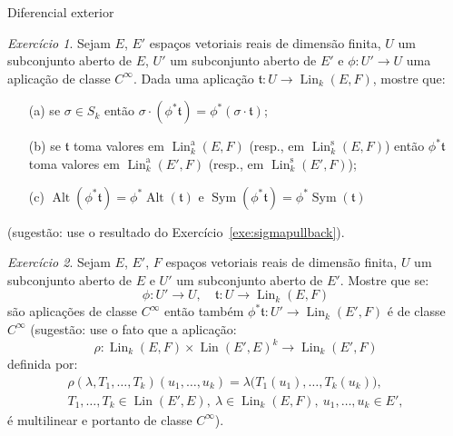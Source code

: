 \documentclass[oneside,11pt]{amsart}
\DeclareMathOperator{\Lin}{Lin}
\DeclareMathOperator{\Sym}{Sym}
\DeclareMathOperator{\Alt}{Alt}
\theoremstyle{remark}\newtheorem{exercise}{Exercício}[section]
\theoremstyle{plain}\newtheorem{teo}{Teorema}[section]
\theoremstyle{plain}\newtheorem{lem}[teo]{Lema}
\theoremstyle{plain}\newtheorem{prop}[teo]{Proposição}
\theoremstyle{definition}\newtheorem{defin}[teo]{Definição}
\theoremstyle{remark}\newtheorem{rem}[teo]{Observação}
\theoremstyle{definition}\newtheorem{example}[teo]{Exemplo}
\numberwithin{equation}{section}
\begin{document}
\begin{section}{Diferencial exterior}
\begin{exercise}\label{exe:sigmapullback2}
Sejam $E$, $E'$ espaços vetoriais reais de dimensão finita, $U$ um subconjunto aberto de $E$, $U'$ um subconjunto aberto de $E'$
e $\phi:U'\to U$ uma aplicação de classe $C^\infty$. Dada uma aplicação $\mathfrak t:U\to\Lin_k(E,F)$, mostre que:
\begin{itemize}
\item[(a)] se $\sigma\in S_k$ então $\sigma\cdot(\phi^*\mathfrak t)=\phi^*(\sigma\cdot\mathfrak t)$;
\item[(b)] se $\mathfrak t$ toma valores em $\Lin_k^{\mathrm a}(E,F)$ (resp., em $\Lin_k^{\mathrm s}(E,F)$) então
$\phi^*\mathfrak t$ toma valores em $\Lin_k^{\mathrm a}(E',F)$ (resp., em $\Lin_k^{\mathrm s}(E',F)$);
\item[(c)] $\Alt(\phi^*\mathfrak t)=\phi^*\Alt(\mathfrak t)$ e $\Sym(\phi^*\mathfrak t)=\phi^*\Sym(\mathfrak t)$
\end{itemize}
(sugestão: use o resultado do Exercício~\ref{exe:sigmapullback}).
\end{exercise}

\begin{exercise}\label{exe:pullbacksmoothvecspa}
Sejam $E$, $E'$, $F$ espaços vetoriais reais de dimensão finita, $U$ um subconjunto aberto de $E$ e $U'$ um subconjunto aberto de $E'$.
Mostre que se:
\[\phi:U'\longrightarrow U,\quad\mathfrak t:U\longrightarrow\Lin_k(E,F)\]
são aplicações de classe $C^\infty$ então também $\phi^*\mathfrak t:U'\to\Lin_k(E',F)$ é de classe $C^\infty$ (sugestão:
use o fato que a aplicação:
\[\rho:\Lin_k(E,F)\times\Lin(E',E)^k\longrightarrow\Lin_k(E',F)\]
definida por:
\begin{multline*}
\rho(\lambda,T_1,\ldots,T_k)(u_1,\ldots,u_k)=\lambda\big(T_1(u_1),\ldots,T_k(u_k)\big),\\
T_1,\ldots,T_k\in\Lin(E',E),\ \lambda\in\Lin_k(E,F),\ u_1,\ldots,u_k\in E',
\end{multline*}
é multilinear e portanto de classe $C^\infty$).
\end{exercise}


\end{section}
\end{document}
